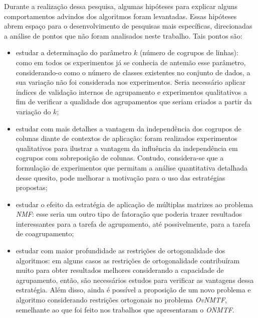 \documentclass[
    12pt,                %
    oneside,            %
    a4paper,            %
    english,            %
    brazil                %
    ]{abntex2ppgsi}
\begin{document}
Durante a realização dessa pesquisa, algumas hipóteses para explicar alguns comportamentos advindos dos algoritmos foram levantadas.
Essas hipóteses abrem espaço para o desenvolvimento de pesquisas mais específicas, direcionadas a análise de pontos que não foram analisados neste trabalho. Tais pontos são:
\begin{itemize}
    \item estudar a determinação do parâmetro $k$ (número de cogrupos de linhas): como em todos os experimentos já se conhecia de antemão esse parâmetro, considerando-o como o número de classes existentes no conjunto de dados, a sua variação não foi considerada nos experimentos. Seria necessário aplicar índices de validação internos de agrupamento e experimentos qualitativos a fim de verificar a qualidade dos agrupamentos que seriam criados a partir da variação do $k$;
    \item estudar com mais detalhes a vantagem da independência dos cogrupos de colunas diante de contextos de aplicação: foram realizados experimentos qualitativos para ilustrar a vantagem da influência da independência em cogrupos com sobreposição de colunas. Contudo, considera-se que a formulação de experimentos que permitam a análise quantitativa detalhada desse quesito, pode melhorar a motivação para o uso das estratégias propostas;
    \item estudar o efeito da estratégia de aplicação de múltiplas matrizes ao problema \textit{NMF}: esse seria um outro tipo de fatoração que poderia trazer resultados interessantes para a tarefa de agrupamento, até possivelmente, para a tarefa de coagrupamento;
    \item estudar com maior profundidade as restrições de ortogonalidade dos algoritmos: em alguns casos as restrições de ortogonalidade contribuíram muito para obter resultados melhores considerando a capacidade de agrupamento, então, são necessários estudos para verificar as vantagens dessa estratégia. Além disso, ainda é possível a proposição de um novo problema e algoritmo considerando restrições ortogonais no problema \textit{OvNMTF}, semelhante ao que foi feito nos trabalhos que apresentaram o \textit{ONMTF}.
\end{itemize}



\end{document}
